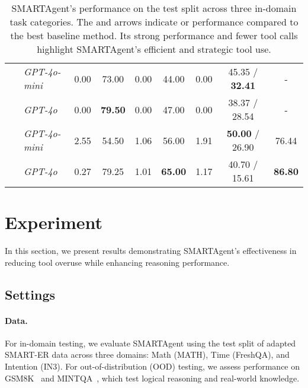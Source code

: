 \begin{table*}[t]
{\begin{tabular}{l @{\hskip 14pt} l c c @{\hskip 14pt} c c @{\hskip 14pt} c c c}
        \addlinespace[2pt]
        \midrule
        \addlinespace[2pt]
         \\ 
        \midrule

         & \textit{GPT-4o-mini} & 0.00 & 73.00 & 0.00 & 44.00 & 0.00 & 45.35 / \textbf{32.41} & - \\ 
        ~ & \textit{GPT-4o} & 0.00 & \textbf{79.50} & 0.00 & 47.00 & 0.00 & 38.37 / 28.54 & - \\ 

        \addlinespace[2pt]
        \midrule
        \addlinespace[2pt]
        
         & \textit{GPT-4o-mini} & 2.55 & 54.50 & 1.06 & 56.00 & 1.91 & \textbf{50.00} / 26.90 & 76.44 \\ 
        ~ & \textit{GPT-4o} & 0.27 & 79.25 & 1.01 & \textbf{65.00} & 1.17 & 40.70 / 15.61 & \textbf{86.80} \\ 
        
        \bottomrule
    \end{tabular}
    }

    \caption{
    SMARTAgent's performance on the test split across three in-domain task categories. The  and  arrows indicate  or  performance compared to the best baseline method. Its strong performance and fewer tool calls highlight SMARTAgent's efficient and strategic tool use.
    }
    \label{tab:result_main}
\end{table*}


\section{Experiment}

In this section, we present results demonstrating SMARTAgent’s effectiveness in reducing tool overuse while enhancing reasoning performance.

\subsection{Settings}

\paragraph{Data.} For in-domain testing, we evaluate SMARTAgent using the test split of adapted SMART-ER data across three domains: Math (MATH), Time (FreshQA), and Intention (IN3). For out-of-distribution (OOD) testing, we assess performance on GSM8K~\citep{cobbe2021training} and MINTQA~\citep{mintqa}, which test logical reasoning and real-world knowledge.

